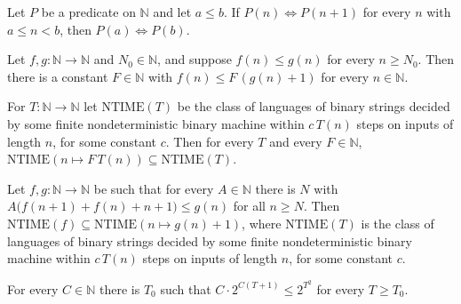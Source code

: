 \begin{lemma}
\label{Complexity.nh_chain}
\leanok
{}
Let $P$ be a predicate on $\mathbb{N}$ and let $a\le b$. If $P(n)\iff P(n+1)$ for every $n$ with
$a\le n<b$, then $P(a)\iff P(b)$.
\end{lemma}

\begin{lemma}
\label{Complexity.nh_absorb}
\leanok
{}
Let $f,g:\mathbb{N}\to\mathbb{N}$ and $N_0\in\mathbb{N}$, and suppose $f(n)\le g(n)$ for every
$n\ge N_0$. Then there is a constant $F\in\mathbb{N}$ with $f(n)\le F\,(g(n)+1)$ for every
$n\in\mathbb{N}$.
\end{lemma}

\begin{lemma}
\label{Complexity.nh_fold}
\leanok
{}
For $T:\mathbb{N}\to\mathbb{N}$ let $\mathrm{NTIME}(T)$ be the class of languages of binary strings
decided by some finite nondeterministic binary machine within $c\,T(n)$ steps on inputs of
length $n$, for some constant $c$. Then for every $T$ and every $F\in\mathbb{N}$,
$\mathrm{NTIME}(n\mapsto F\,T(n))\subseteq\mathrm{NTIME}(T)$.
\end{lemma}

\begin{lemma}
\label{Complexity.nh_inclusion}
\leanok
{}
Let $f,g:\mathbb{N}\to\mathbb{N}$ be such that for every $A\in\mathbb{N}$ there is $N$ with
$A\bigl(f(n+1)+f(n)+n+1\bigr)\le g(n)$ for all $n\ge N$. Then
$\mathrm{NTIME}(f)\subseteq\mathrm{NTIME}(n\mapsto g(n)+1)$, where $\mathrm{NTIME}(T)$ is the class
of languages of binary strings decided by some finite nondeterministic binary machine within
$c\,T(n)$ steps on inputs of length $n$, for some constant $c$.
\end{lemma}

\begin{lemma}
\label{Complexity.nh_top}
\leanok
{}
For every $C\in\mathbb{N}$ there is $T_0$ such that $C\cdot 2^{C(T+1)}\le 2^{T^2}$ for every
$T\ge T_0$.
\end{lemma}

